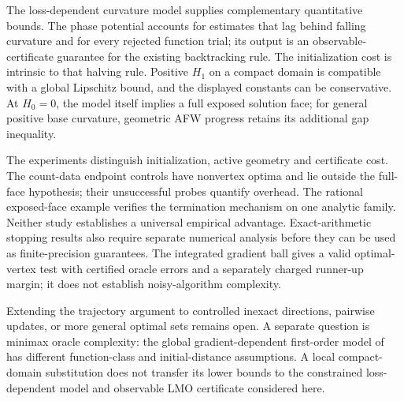 \documentclass[a4paper,11pt]{article}
\begin{document}
The loss-dependent curvature model supplies complementary quantitative
bounds. The phase potential accounts for estimates that lag behind
falling curvature and for every rejected function trial; its output is
an observable-certificate guarantee for the existing backtracking rule.
The initialization cost is intrinsic to that halving rule. Positive
$H_1$ on a compact domain is compatible with a global Lipschitz bound,
and the displayed constants can be conservative. At $H_0=0$, the model
itself implies a full exposed solution face; for general positive base
curvature, geometric AFW progress retains its additional gap inequality.

The experiments distinguish initialization, active geometry and
certificate cost. The count-data endpoint controls have nonvertex
optima and lie outside the full-face hypothesis; their unsuccessful
probes quantify overhead. The rational exposed-face example verifies
the termination mechanism on one analytic family. Neither study
establishes a universal empirical advantage. Exact-arithmetic stopping
results also require separate numerical analysis before they can be
used as finite-precision guarantees. The integrated gradient ball gives
a valid optimal-vertex test with certified oracle errors and a separately
charged runner-up margin; it does not establish noisy-algorithm
complexity.

Extending the trajectory argument to controlled inexact directions,
pairwise updates, or more general optimal sets remains open. A separate
question is minimax oracle complexity: the global gradient-dependent
first-order model of~\cite{everest} has different function-class and
initial-distance assumptions. A local compact-domain substitution does
not transfer its lower bounds to the constrained loss-dependent model
and observable LMO certificate considered here.


\appendix

\end{document}
